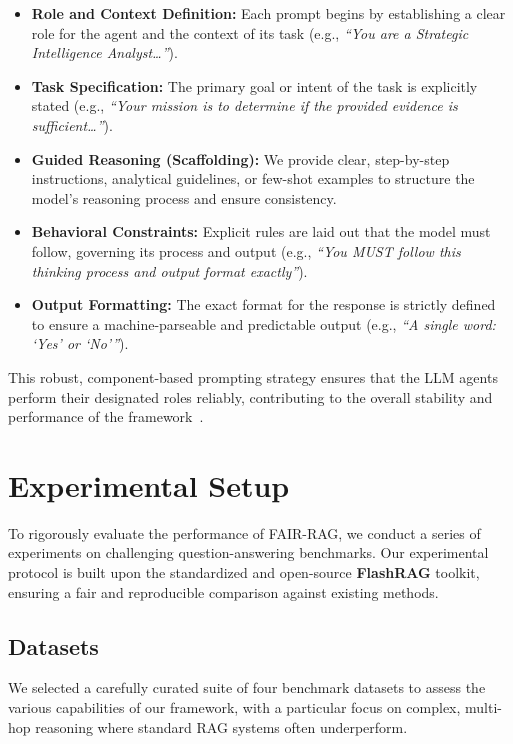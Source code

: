 \documentclass[11pt]{article}
\begin{document}
\begin{itemize}
    \item \textbf{Role and Context Definition:} Each prompt begins by establishing a clear role for the agent and the context of its task (e.g., \emph{``You are a Strategic Intelligence Analyst\ldots''}).
    \item \textbf{Task Specification:} The primary goal or intent of the task is explicitly stated (e.g., \emph{``Your mission is to determine if the provided evidence is sufficient\ldots''}).
    \item \textbf{Guided Reasoning (Scaffolding):} We provide clear, step-by-step instructions, analytical guidelines, or few-shot examples to structure the model's reasoning process and ensure consistency.
    \item \textbf{Behavioral Constraints:} Explicit rules are laid out that the model must follow, governing its process and output (e.g., \emph{``You MUST follow this thinking process and output format exactly''}).
    \item \textbf{Output Formatting:} The exact format for the response is strictly defined to ensure a machine-parseable and predictable output (e.g., \emph{``A single word: `Yes' or `No'''}).
\end{itemize}

This robust, component-based prompting strategy ensures that the LLM agents perform their designated roles reliably, contributing to the overall stability and performance of the framework~\cite{liu2021pretrainpromptpredictsystematic}.

\section{Experimental Setup}

To rigorously evaluate the performance of FAIR-RAG, we conduct a series of experiments on challenging question-answering benchmarks. Our experimental protocol is built upon the standardized and open-source \textbf{FlashRAG} toolkit, ensuring a fair and reproducible comparison against existing methods.

\subsection{Datasets}

We selected a carefully curated suite of four benchmark datasets to assess the various capabilities of our framework, with a particular focus on complex, multi-hop reasoning where standard RAG systems often underperform.
\end{document}
